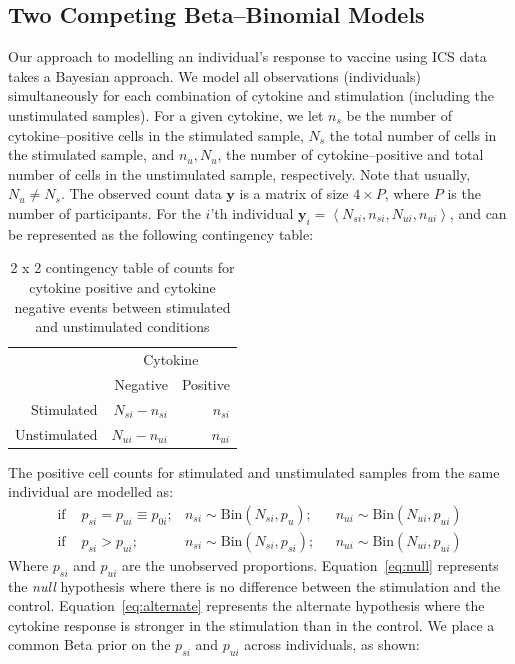 \documentclass[11pt]{article}
\begin{document}
\subsection{Two Competing Beta--Binomial Models}
Our approach to modelling an individual's response to vaccine using ICS data takes a Bayesian approach. We model all observations (individuals) simultaneously for each combination of cytokine and stimulation (including the unstimulated samples). For a given cytokine, we let $n_s$ be the number of cytokine--positive cells in the stimulated sample, $N_s$ the total number of cells in the stimulated sample, and $n_u, N_u$, the number of cytokine--positive and total number of cells in the unstimulated sample, respectively. Note that usually, $N_u \ne N_s$. The observed count data $\mathbf{y}$ is a matrix of size $4 \times P$, where $P$ is the number of participants. For the $i$'th individual $\mathbf{y}_i = \left<N_{si},n_{si},N_{ui},n_{ui}\right>$, and can be represented as the following contingency table: 
\begin{table}[ht]
\centering
\parbox{0.8\linewidth}{
\caption{2 x 2 contingency table of counts for cytokine positive and cytokine negative events between stimulated and unstimulated conditions}\label{tab:twobytwo}
\centering
\begin{tabular}{rrr}

  \hline
\multicolumn{1}{l}{}&
\multicolumn{2}{c}{Cytokine}\\
 & Negative & Positive \\ 
  \hline
Stimulated &   $N_{si} - n_{si}$ &   $n_{si}$ \\ 
Unstimulated &   $N_{ui}-n_{ui}$ &   $n_{ui}$ \\ 
   \hline
\end{tabular}
}
\end{table}

The positive cell counts for stimulated and unstimulated samples from the same individual are modelled as:
\begin{align}
  \text{if }&p_{si}=p_{ui}\equiv p_{0i};& n_{si} \sim \mathrm{Bin}(N_{si},p_u);\text{ }& n_{ui} \sim \mathrm{Bin}(N_{ui},p_{ui})\label{eq:null}\\
 \text{if }&p_{si}>p_{ui};& n_{si} \sim \mathrm{Bin}(N_{si},p_{si});\text{ }& n_{ui} \sim \mathrm{Bin}(N_{ui},p_{ui})\label{eq:alternate}
 \end{align}
Where $p_{si}$ and $p_{ui}$ are the unobserved proportions. Equation~\eqref{eq:null} represents the \textit{null} hypothesis where there is no difference between the stimulation and the control. Equation~\eqref{eq:alternate} represents the  alternate hypothesis where the cytokine response is stronger in the stimulation than in the control. We place a common Beta prior on the $p_{si}$ and $p_{ui}$ across individuals, as shown:
 
\end{document}
